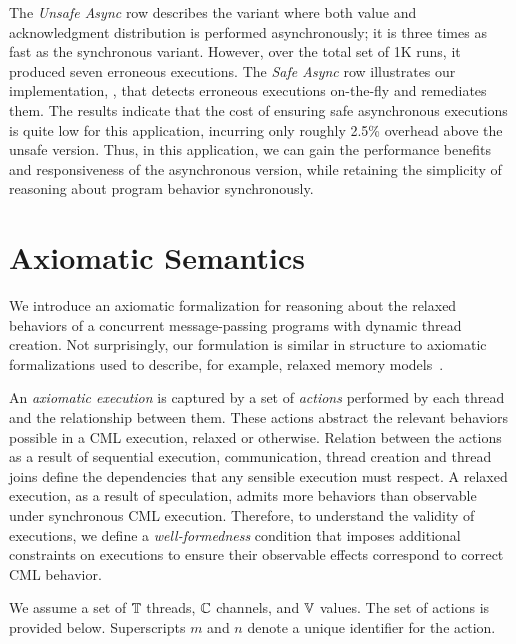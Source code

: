 The \emph{Unsafe Async} row describes the variant where both value and
acknowledgment distribution is performed asynchronously; it is three times as
fast as the synchronous variant.  However, over the total set of 1K runs, it
produced seven erroneous executions. The \emph{Safe Async} row illustrates our
implementation, \rxcml, that detects erroneous executions on-the-fly and
remediates them. The results indicate that the cost of ensuring safe
asynchronous executions is quite low for this application, incurring only
roughly 2.5\% overhead above the unsafe version. Thus, in this application, we
can gain the performance benefits and responsiveness of the asynchronous
version, while retaining the simplicity of reasoning about program behavior
synchronously.

\section{Axiomatic Semantics}
\label{sec:axiomatic}

We introduce an axiomatic formalization for reasoning about the relaxed
behaviors of a concurrent message-passing programs with dynamic thread
creation. Not surprisingly, our formulation is similar in structure to
axiomatic formalizations used to describe, for example, relaxed memory
models~\cite{Demange2013,Sarkar2011,Sewell2010}.

An \emph{axiomatic execution} is captured by a set of \emph{actions} performed
by each thread and the relationship between them. These actions abstract the
relevant behaviors possible in a CML execution, relaxed or otherwise. Relation
between the actions as a result of sequential execution, communication, thread
creation and thread joins define the dependencies that any sensible execution must
respect. A relaxed execution, as a result of speculation, admits more behaviors
than observable under synchronous CML execution. Therefore, to understand the
validity of executions, we define a \emph{well-formedness} condition that
imposes additional constraints on executions to ensure their observable effects
correspond to correct CML behavior.

We assume a set of $\mathbb{T}$ threads, $\mathbb{C}$ channels, and
$\mathbb{V}$ values.  The set of actions is provided below. Superscripts $m$
and $n$ denote a unique identifier for the action.

